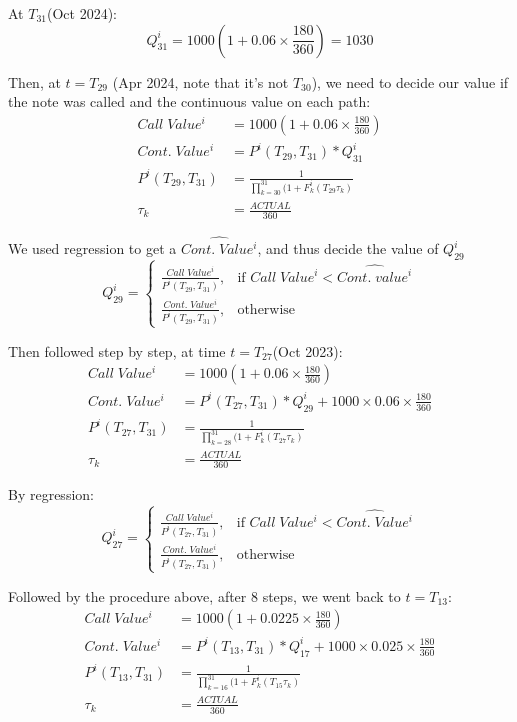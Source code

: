 \documentclass[paper = letterpaper, fontsize=12pt]{article}
\begin{document}
At $T_{31}$(Oct 2024):
\[
	Q_{31}^i = 1000(1+0.06\times\frac{180}{360}) = 1030
\]

Then, at $t = T_{29}$ (Apr 2024, note that it's not $T_{30}$), we need to decide our value if the note was called and the continuous value on each path:
\begin{align}
	Call\;Value^i &= 1000(1+0.06\times\frac{180}{360})\\
	Cont.\;Value^i &= P^i(T_{29}, T_{31}) * Q_{31}^i\\
	P^i(T_{29}, T_{31}) &= \frac{1}{\prod_{k=30}^{31}(1+F_k^i(T_{29}\tau_k)}\\
	\tau_k &= \frac{ACTUAL}{360}
\end{align}

We used regression to get a $\hat{Cont.\;Value^i}$, and thus decide the value of $Q_{29}^i$
\[
    Q_{29}^i = 
\begin{cases}
    \frac{Call\;Value^i}{P^i(T_{29}, T_{31})},& \text{if } Call\;Value^i< \hat{Cont.\; value^i}\\
    \frac{Cont.\;Value^i}{P^i(T_{29}, T_{31})},              & \text{otherwise}
\end{cases}
\]

Then followed step by step, at time $t = T_{27}$(Oct 2023):
\begin{align}
	Call\;Value^i &= 1000(1+0.06\times\frac{180}{360})\\
	Cont.\;Value^i &= P^i(T_{27}, T_{31}) * Q_{29}^i + 1000\times0.06\times\frac{180}{360}\\
	P^i(T_{27}, T_{31}) &= \frac{1}{\prod_{k=28}^{31}(1+F_k^i(T_{27}\tau_k)}\\
	\tau_k &= \frac{ACTUAL}{360}
\end{align}

By regression:
\[
    Q_{27}^i = 
\begin{cases}
    \frac{Call\;Value^i}{P^i(T_{27}, T_{31})},& \text{if } Call\;Value^i< \hat{Cont.\;Value^i}\\
    \frac{Cont.\;Value^i}{P^i(T_{27}, T_{31})},              & \text{otherwise}
\end{cases}
\]

Followed by the procedure above, after 8 steps, we went back to $t = T_{13}$:
\begin{align}
  Call\;Value^i &= 1000(1+0.0225\times\frac{180}{360})\\
  Cont.\;Value^i &= P^i(T_{13}, T_{31}) * Q_{17}^i + 1000\times0.025\times\frac{180}{360}\\
  P^i(T_{13}, T_{31}) &= \frac{1}{\prod_{k=16}^{31}(1+F_k^i(T_{15}\tau_k)}\\
  \tau_k &= \frac{ACTUAL}{360}
\end{align}
\end{document}

